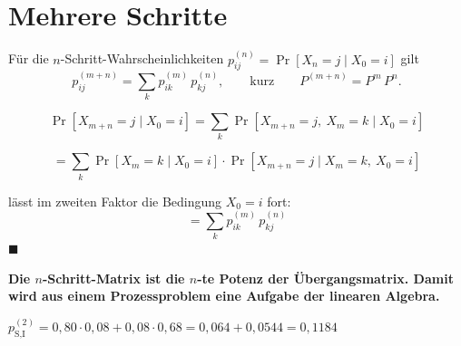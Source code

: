 \section{Mehrere Schritte}

\begin{merksatz}
Für die $n$-Schritt-Wahrscheinlichkeiten $p^{(n)}_{ij} = \Pr[X_n = j \mid X_0 = i]$ gilt
\[ p^{(m+n)}_{ij} = \sum_{k} p^{(m)}_{ik}\,p^{(n)}_{kj} , \qquad\text{kurz}\qquad P^{(m+n)} = P^{m}\,P^{n} . \]

\[ \Pr[X_{m+n} = j \mid X_0 = i] = \sum_k \Pr[X_{m+n}=j,\ X_m = k \mid X_0 = i] \]

\[ = \sum_k \Pr[X_m = k \mid X_0=i]\cdot\Pr[X_{m+n}=j \mid X_m=k,\ X_0=i] \]

 lässt im zweiten Faktor die Bedingung $X_0=i$ fort:
\[ = \sum_k p^{(m)}_{ik}\,p^{(n)}_{kj} \]
$\blacksquare$

\begin{center}
\begin{minipage}{0.9\textwidth}
\textbf{Die $n$-Schritt-Matrix ist die $n$-te Potenz der Übergangsmatrix. Damit wird aus einem Prozessproblem eine Aufgabe der linearen Algebra.}
\end{minipage}
\end{center}

 $p^{(2)}_{\text{S},\text{I}} = 0{,}80\cdot0{,}08 + 0{,}08\cdot0{,}68 = 0{,}064+0{,}0544 = 0{,}1184$ \checkmark
\end{merksatz}

